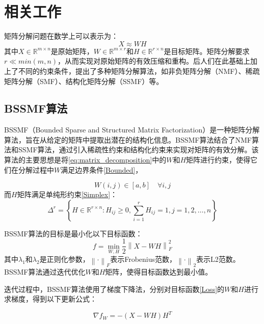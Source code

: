 \documentclass[12pt]{article}
\begin{document}
\newpage

\section{相关工作}
矩阵分解问题在数学上可以表示为：
\begin{equation}
    X \approx WH
    \label{eq:matrix_decomposition}
\end{equation}
其中$X\in \mathbb{R}^{m \times n}$是原始矩阵，$W \in \mathbb{R}^{m \times r}$和$H \in \mathbb{R}^{r \times n}$是目标矩阵。矩阵分解要求$r\ll min(m, n)$\cite{NMFIdentifiability}，从而实现对原始矩阵的有效压缩和重构。后人们在此基础上加上了不同的约束条件，提出了多种矩阵分解算法，如非负矩阵分解（NMF）\cite{NMF}、稀疏矩阵分解（SMF）\cite{SMF}、结构化矩阵分解（SSMF）\cite{SSMF2}\cite{SSMF1}等。
\subsection{BSSMF算法}
BSSMF（Bounded Sparse and Structured Matrix Factorization）\cite{BSSMF}是一种矩阵分解算法，旨在从给定的矩阵中提取出潜在的结构化信息。BSSMF算法结合了NMF算法和SSMF算法，通过引入稀疏性约束和结构化约束来实现对矩阵的有效分解。该算法的主要思想是将\eqref{eq:matrix_decomposition}中的$W$和$H$矩阵进行约束，使得它们在分解过程中$W$满足边界条件\eqref{Bounded}，

\begin{equation}
    W(i,j) \in [a, b] \quad \forall i,j
    \label{Bounded}
\end{equation}
而$H$矩阵满足单纯形约束\eqref{Simplex}：
\begin{equation}
    \Delta^r = \left\{ H \in \mathbb{R}^{r \times n} : H_{ij} \geq 0, \sum_{i=1}^{r} H_{ij} = 1, j=1,2,\ldots,n \right\}
    \label{Simplex}
\end{equation}

BSSMF算法的目标是最小化以下目标函数：
\begin{equation}
    f = \min_{W,H} \frac{1}{2}\left\lVert X - WH \right\rVert_F^2 
    \label{Loss}
\end{equation}
其中$\lambda_1$和$\lambda_2$是正则化参数，$\left\lVert \cdot \right\rVert_F$表示Frobenius范数，$\left\lVert \cdot \right\rVert_2$表示L2范数。BSSMF算法通过迭代优化$W$和$H$矩阵，使得目标函数达到最小值。

迭代过程中，BSSMF算法使用了梯度下降法，分别对目标函数\eqref{Loss}的$W$和$H$进行求梯度，得到以下更新公式：

\begin{equation}
    \nabla f_W = -\left( X - WH \right)H^T
    \label{Gradient_W}
\end{equation}
\end{document}
